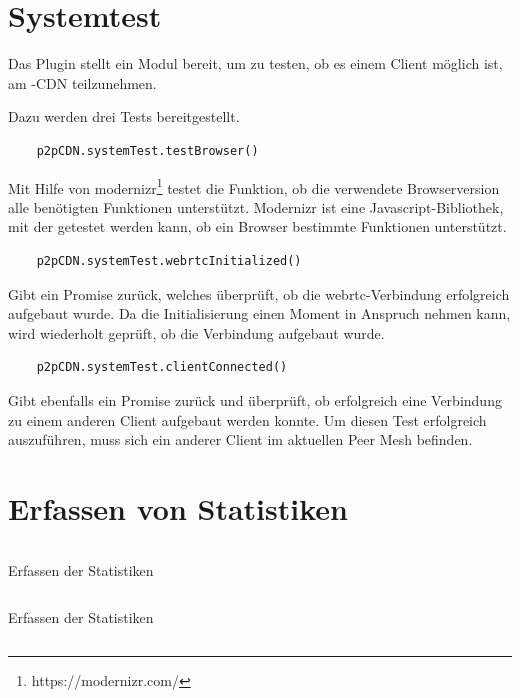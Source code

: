 \begin{description}
\section{Systemtest}\label{i:system-test}
Das Plugin stellt ein Modul bereit, um zu testen, ob es einem Client möglich ist, am \pTp-CDN teilzunehmen.

Dazu werden drei Tests bereitgestellt.
\begin{lstlisting}
	p2pCDN.systemTest.testBrowser()
\end{lstlisting}
 Mit Hilfe von modernizr\footnote{https://modernizr.com/} testet die Funktion, ob die verwendete Browserversion alle benötigten Funktionen unterstützt. Modernizr ist eine Javascript-Bibliothek, mit der getestet werden kann, ob ein Browser bestimmte Funktionen unterstützt.
\begin{lstlisting}
	p2pCDN.systemTest.webrtcInitialized()
\end{lstlisting}
Gibt ein Promise zurück, welches überprüft, ob die webrtc-Verbindung erfolgreich aufgebaut wurde. Da die Initialisierung einen Moment in Anspruch nehmen kann, wird wiederholt geprüft, ob die Verbindung aufgebaut wurde.
\begin{lstlisting}
	p2pCDN.systemTest.clientConnected()
\end{lstlisting}
Gibt ebenfalls ein Promise zurück und überprüft, ob erfolgreich eine Verbindung zu einem anderen Client aufgebaut werden konnte. Um diesen Test erfolgreich auszuführen, muss sich ein anderer Client im aktuellen Peer Mesh befinden.

\section{Erfassen von Statistiken}\label{ch:implementation:stats}
\begin{listing}[h]
	\inputminted{javascript}{listings/sendStatistic.js}
	\caption{Erfassen der Statistiken}
	\label{lst:code-stats}
\end{listing}
\begin{listing}[h]
	\inputminted{javascript}{listings/logStatistic.js}
	\caption{Erfassen der Statistiken}
	\label{lst:code-stats}
\end{listing}

\begin{listing}[h]
	\inputminted{javascript}{listings/_handle_chunk.js}
	\caption{}
	\label{lst:handle_chunk}
\end{listing}


\end{description}
